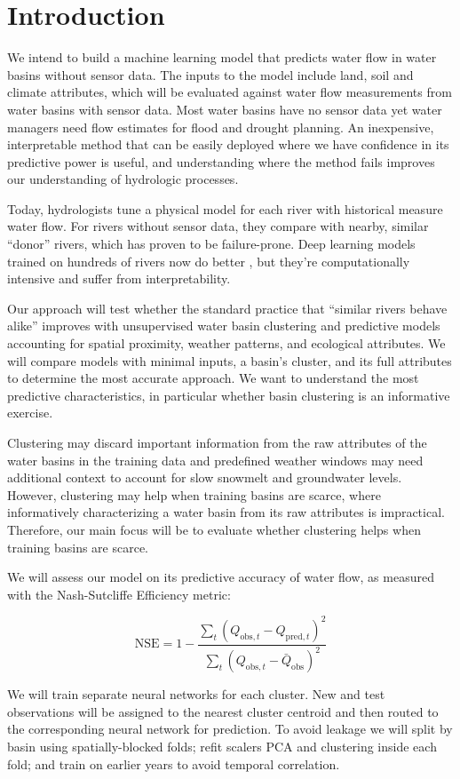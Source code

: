 \section{Introduction}\label{introduction}

We intend to build a machine learning model that predicts water flow in
water basins without sensor data. The inputs to the model include land,
soil and climate attributes, which will be evaluated against water flow
measurements from water basins with sensor data. Most water basins have
no sensor data yet water managers need flow estimates for flood and
drought planning. An inexpensive, interpretable method that can be
easily deployed where we have confidence in its predictive power is
useful, and understanding where the method fails improves our
understanding of hydrologic processes.

Today, hydrologists tune a physical model for each river with historical
measure water flow. For rivers without sensor data, they compare with
nearby, similar ``donor'' rivers, which has proven to be failure-prone.
Deep learning models trained on hundreds of rivers now do better
\citep{kratzert2019}, but they're computationally intensive and suffer
from interpretability.

Our approach will test whether the standard practice that ``similar
rivers behave alike'' improves with unsupervised water basin clustering
and predictive models accounting for spatial proximity, weather
patterns, and ecological attributes. We will compare models with minimal
inputs, a basin's cluster, and its full attributes to determine the most
accurate approach. We want to understand the most predictive
characteristics, in particular whether basin clustering is an
informative exercise.

Clustering may discard important information from the raw attributes of
the water basins in the training data and predefined weather windows may
need additional context to account for slow snowmelt and groundwater
levels. However, clustering may help when training basins are scarce,
where informatively characterizing a water basin from its raw attributes
is impractical. Therefore, our main focus will be to evaluate whether
clustering helps when training basins are scarce.

We will assess our model on its predictive accuracy of water flow, as
measured with the Nash-Sutcliffe Efficiency metric:

\[
\mathrm{NSE} = 1 - \frac{\sum_{t} \left(Q_{\mathrm{obs},t} - Q_{\mathrm{pred},t}\right)^2}{\sum_{t} \left(Q_{\mathrm{obs},t} - \bar{Q}_{\mathrm{obs}}\right)^2}
\]

We will train separate neural networks for each cluster. New and test
observations will be assigned to the nearest cluster centroid and then
routed to the corresponding neural network for prediction. To avoid
leakage we will split by basin using spatially-blocked folds; refit
scalers PCA and clustering inside each fold; and train on earlier years
to avoid temporal correlation.
